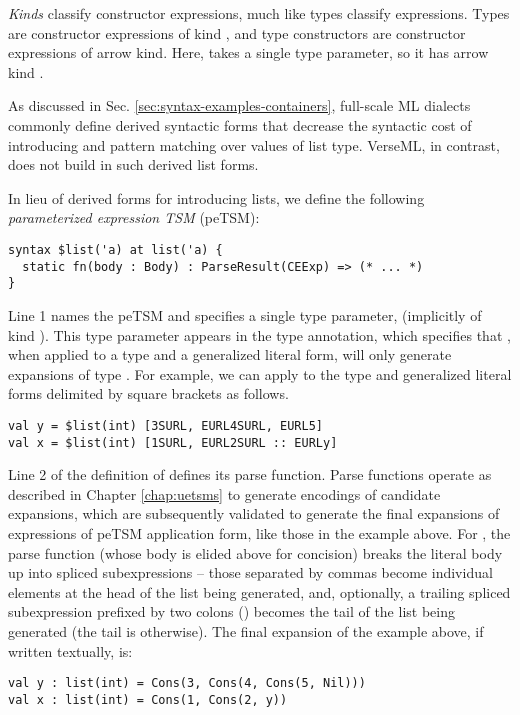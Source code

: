 \emph{Kinds} classify constructor expressions, much like types classify expressions. Types are constructor expressions of kind , and type constructors are constructor expressions of arrow kind. Here,  takes a single type parameter, so it has arrow kind .

As discussed in Sec. \ref{sec:syntax-examples-containers}, full-scale ML dialects commonly define derived syntactic forms that decrease the syntactic cost of introducing and pattern matching over values of list type. VerseML, in contrast, does not build in such derived list forms. 

In lieu of derived forms for introducing lists, we define the following \emph{parameterized expression TSM} (peTSM):
\begin{lstlisting}
syntax $list('a) at list('a) {
  static fn(body : Body) : ParseResult(CEExp) => (* ... *)
}
\end{lstlisting}
Line 1 names the peTSM  and specifies a single type parameter,  (implicitly of kind ). This type parameter appears in the type annotation, which specifies that , when applied to a type  and a generalized literal form, will only generate expansions of type . For example, we can apply  to the type  and generalized literal forms delimited by square brackets as follows.
\begin{lstlisting}[numbers=none]
val y = $list(int) [3SURL, EURL4SURL, EURL5]
val x = $list(int) [1SURL, EURL2SURL :: EURLy]
\end{lstlisting}

Line 2 of the definition of  defines its parse function. Parse functions operate as described in Chapter \ref{chap:uetsms} to generate encodings of candidate expansions, which are subsequently validated to generate the final expansions of expressions of peTSM application form, like those in the example above. For , the parse function (whose body is elided above for concision) breaks the literal body up into  spliced subexpressions -- those separated by commas become individual elements at the head of the list being generated, and, optionally, a trailing spliced subexpression prefixed by two colons () becomes the tail of the list being generated (the tail is  otherwise). The final expansion of the example above, if written textually, is:
\begin{lstlisting}[numbers=none]
val y : list(int) = Cons(3, Cons(4, Cons(5, Nil)))
val x : list(int) = Cons(1, Cons(2, y))
\end{lstlisting}

